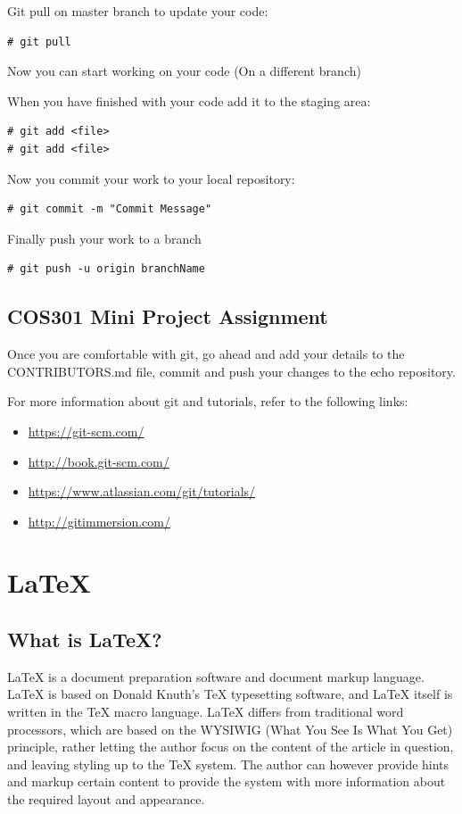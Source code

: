\documentclass[a4paper,10pt]{article}
\begin{document}
Git pull on master branch to update your code:
\begin{lstlisting}[style=TerminalStyle]
# git pull
\end{lstlisting}
Now you can start working on your code (On a different branch)

When you have finished with your code add it to the staging area:
\begin{lstlisting}[style=TerminalStyle]
# git add <file>
# git add <file>
\end{lstlisting}

Now you commit your work to your local repository:
\begin{lstlisting}[style=TerminalStyle]
# git commit -m "Commit Message"
\end{lstlisting}

Finally push your work to a branch
\begin{lstlisting}[style=TerminalStyle]
# git push -u origin branchName
\end{lstlisting}


\subsection{COS301 Mini Project Assignment}
Once you are comfortable with git, go ahead and add your details to the CONTRIBUTORS.md file, commit and push your changes to the echo repository.

For more information about git and tutorials, refer to the following links:

\begin{itemize}
\item \url{https://git-scm.com/}
\item \url{http://book.git-scm.com/}
\item \url{https://www.atlassian.com/git/tutorials/}
\item \url{http://gitimmersion.com/}
\end{itemize}


\section{\LaTeX{}}
\subsection{What is \LaTeX{}?}

\LaTeX{} is a document preparation software and document markup language. \LaTeX{} is based on Donald Knuth's \TeX{} typesetting software, and LaTeX itself is written in the \TeX{} macro language. \LaTeX{} differs from traditional word processors, which are based on the WYSIWIG (What You See Is What You Get) principle, rather letting the author focus on the content of the article in question, and leaving styling up to the TeX system. The author can however provide hints and markup certain content to provide the system with more information about the required layout and appearance. 
\end{document}
